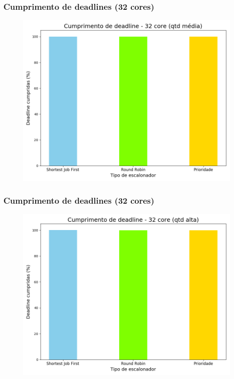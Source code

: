 \documentclass{beamer}
\begin{document}
\begin{frame}
\frametitle{Cumprimento de deadlines (32 cores)}
\begin{figure}
\includegraphics[scale=0.4]{deadline_med_32.png}
\end{figure}
\end{frame}

\begin{frame}
\frametitle{Cumprimento de deadlines (32 cores)}
\begin{figure}
\includegraphics[scale=0.4]{deadline_long_32.png}
\end{figure}
\end{frame}
\end{document}
